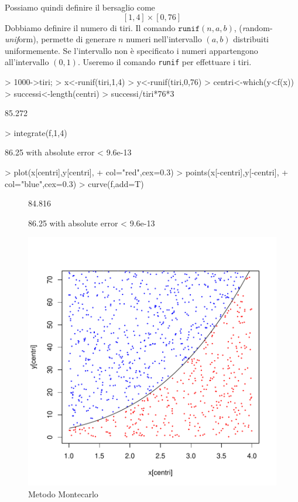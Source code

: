 \documentclass[onecolumn,11pt]{book}
\begin{document}
Possiamo quindi definire il bersaglio come
$$[1,4]\times [0,76]$$
Dobbiamo definire il numero di tiri. 
Il comando $\texttt{runif}(n,a,b)$, ({\it r}andom-{\it unif}orm), permette di generare $n$ numeri nell'intervallo $(a,b)$ distribuiti uniformemente. Se l'intervallo non \`e specificato i numeri appartengono all'intervallo $(0,1)$.
Useremo il comando  \texttt{runif} per effettuare i tiri.

\par
\begin{Schunk}
\begin{Sinput}
> 1000->tiri;
> x<-runif(tiri,1,4)  	 
> y<-runif(tiri,0,76)
> centri<-which(y<f(x))	 
> successi<-length(centri)
> successi/tiri*76*3                    
\end{Sinput}
\begin{Soutput}
[1] 85.272
\end{Soutput}
\begin{Sinput}
> integrate(f,1,4)
\end{Sinput}
\begin{Soutput}
86.25 with absolute error < 9.6e-13
\end{Soutput}
\begin{Sinput}
> plot(x[centri],y[centri],
+ col="red",cex=0.3)   
> points(x[-centri],y[-centri],
+ col="blue",cex=0.3)  
> curve(f,add=T)		
\end{Sinput}
\end{Schunk}
\begin{figure}[htbp]
\begin{center}
\begin{Schunk}
\begin{Soutput}
[1] 84.816
\end{Soutput}
\begin{Soutput}
86.25 with absolute error < 9.6e-13
\end{Soutput}
\end{Schunk}
\includegraphics{statisticaconR-120}
\caption{Metodo Montecarlo }
\label{fig:Montec1}
\end{center}
\end{figure}
\end{document}
